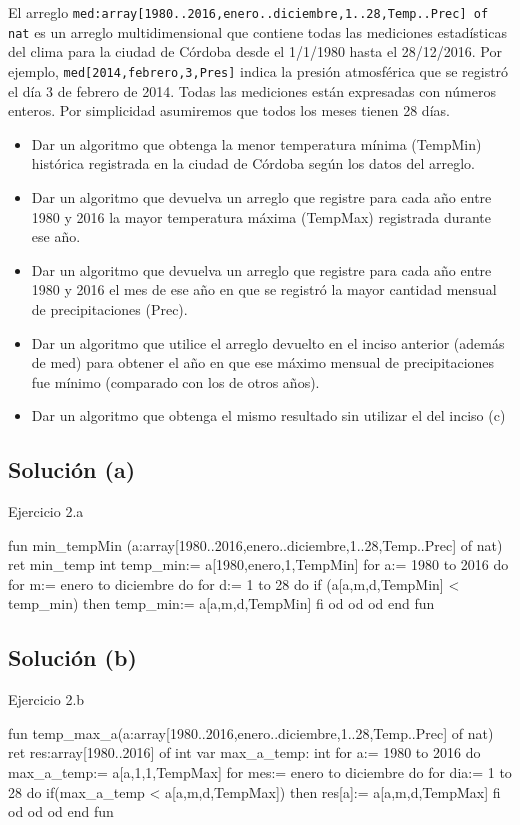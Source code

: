 El arreglo \texttt{med:array[1980..2016,enero..diciembre,1..28,Temp..Prec] of nat} es un arreglo multidimensional que contiene todas las mediciones estadísticas del clima para la ciudad de Córdoba desde el 1/1/1980 hasta el 28/12/2016. Por ejemplo, \texttt{med[2014,febrero,3,Pres]} indica la presión atmosférica que se registró el día 3 de febrero de 2014. Todas las mediciones están expresadas con números enteros. Por simplicidad asumiremos que todos los meses tienen 28 días.

\begin{itemize}
    \item[(a)] Dar un algoritmo que obtenga la menor temperatura mínima (TempMin) histórica registrada en la ciudad de Córdoba según los datos del arreglo.
    \item[(b)] Dar un algoritmo que devuelva un arreglo que registre para cada año entre 1980 y 2016 la mayor temperatura máxima (TempMax) registrada durante ese año.
    \item[(c)] Dar un algoritmo que devuelva un arreglo que registre para cada año entre 1980 y 2016 el mes de ese año en que se registró la mayor cantidad mensual de precipitaciones (Prec).
    \item[(d)] Dar un algoritmo que utilice el arreglo devuelto en el inciso anterior (además de med) para obtener el año en que ese máximo mensual de precipitaciones fue mínimo (comparado con los de otros años).
    \item[(e)]  Dar un algoritmo que obtenga el mismo resultado sin utilizar el del inciso (c)
\end{itemize}

\subsection{Solución (a)}
\begin{codebox}{Ejercicio 2.a}
\begin{pascallike}
fun min_tempMin (a:array[1980..2016,enero..diciembre,1..28,Temp..Prec] of nat) 
    ret min_temp int
temp_min:= a[1980,enero,1,TempMin]
for a:= 1980 to 2016 do
    for m:= enero to diciembre do
        for d:= 1 to 28 do
            if (a[a,m,d,TempMin] < temp_min) then
                temp_min:= a[a,m,d,TempMin]
            fi 
        od
    od
od
end fun
\end{pascallike}
\end{codebox}

\subsection{Solución (b)}
\begin{codebox}{Ejercicio 2.b}
\begin{pascallike}
fun temp_max_a(a:array[1980..2016,enero..diciembre,1..28,Temp..Prec] of nat)
    ret res:array[1980..2016] of int
var max_a_temp: int
for a:= 1980 to 2016 do
    max_a_temp:= a[a,1,1,TempMax]
    for mes:= enero to diciembre do
        for dia:= 1 to 28 do
        if(max_a_temp < a[a,m,d,TempMax]) then
            res[a]:= a[a,m,d,TempMax]
        fi
        od
    od
od
end fun
\end{pascallike}
\end{codebox}

